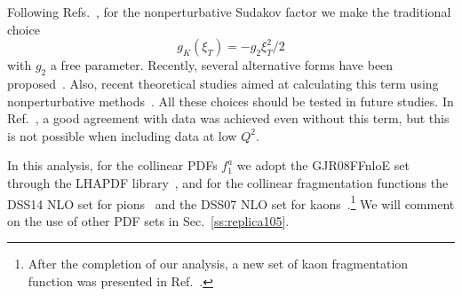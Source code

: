 \documentclass[aps,preprintnumbers,showpacs,nofootinbib,superscriptaddress,floatfix]{revtex4}
\newcommand{\bT}{\xi_T}
\begin{document}


Following Refs.~\cite{Nadolsky:1999kb,Landry:2002ix,Konychev:2005iy}, for the
nonperturbative Sudakov factor we make the traditional choice 
\begin{equation}
g_K (\bT) = - g_2 \bT^2 / 2
\end{equation} 
with $g_2$ a free parameter. Recently, several alternative
forms have been proposed~\cite{Aidala:2014hva,Collins:2014jpa}. Also, recent
theoretical studies aimed at calculating this term using nonperturbative
methods~\cite{Scimemi:2016ffw}.  
All these
choices should be tested in future studies. In Ref.~\cite{D'Alesio:2014vja}, a
good agreement with data was achieved even without this term, but this is
not possible when including data at low $Q^2$.

In this analysis, for the collinear PDFs $f_1^a$ we adopt the GJR08FFnloE
set~\cite{Gluck:2007ck} through the LHAPDF library~\cite{Buckley:2014ana}, and
for the collinear fragmentation functions 
the DSS14 NLO set for
pions~\cite{deFlorian:2014xna} and the DSS07 NLO set for
kaons~\cite{deFlorian:2007aj}.\footnote{After the completion of our analysis, 
a new set of kaon
  fragmentation function was presented in Ref.~\cite{deFlorian:2017lwf}.} We
will comment on the use of other PDF sets in Sec.~\ref{ss:replica105}.
\end{document}
